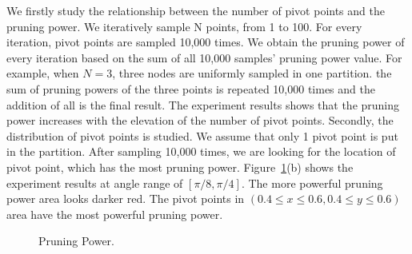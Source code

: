 We firstly study the relationship between the number of pivot points and the pruning power. We iteratively sample N points, from 1 to 100. For every iteration, pivot points are sampled 10,000 times. We obtain the pruning power of every iteration based on the sum of all 10,000 samples' pruning power value. For example, when $N=3$, three nodes are uniformly sampled in one partition. the sum of pruning powers of the three points is repeated 10,000 times and the addition of all is the final result. The experiment results shows that the pruning power increases with the elevation of the number of pivot points. Secondly, the distribution of pivot points is studied. We assume that only 1 pivot point is put in the partition. After sampling 10,000 times, we are looking for the location of pivot point, which has the most pruning power. Figure~\ref{figure:PP}(b) shows the experiment results at angle range of $[\pi/8, \pi/4]$. The more powerful pruning power area looks darker red. The pivot points in $( 0.4 \leq x \leq 0.6, 0.4 \leq y \leq 0.6)$ area have the most powerful pruning power.


\begin{figure}[t]
\vspace*{-20pt}
  \centering
    \hspace*{-14pt}
    \hspace*{-14pt}
\vspace*{-5pt}
  \caption{Pruning Power.}
  \label{figure:PP}
\vspace*{-16pt}
\end{figure}

